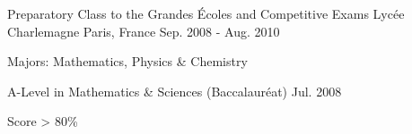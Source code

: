 \begin{cventries}
  \cventry
    {Preparatory Class to the Grandes Écoles and Competitive Exams} %
    {Lycée Charlemagne} %
    {Paris, France} %
    {Sep. 2008 - Aug. 2010} %
    {
      \begin{cvitems} %
        \item {Majors: Mathematics, Physics \& Chemistry}
      \end{cvitems}
    }
    
  \cventry
    {\faGraduationCap\acvHeaderIconSep A-Level in Mathematics \& Sciences (Baccalauréat)} %
    {}%
    {}%
    {Jul. 2008} %
    {
      \begin{cvitems} %
        \item {Score > 80\%}
      \end{cvitems}
    }

\end{cventries}
